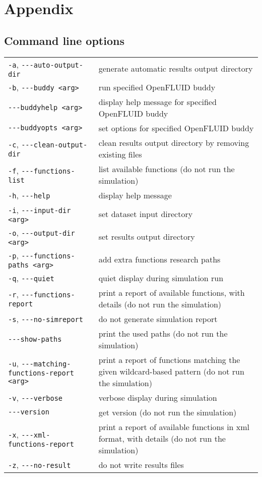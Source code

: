 \chapter{Appendix}



\section{Command line options}

\begin{center}
\begin{tabularx}{\linewidth}{lX}
\texttt{-a}, \verb?---?\texttt{auto-output-dir}&generate automatic results output directory\\
\texttt{-b}, \verb?---?\texttt{buddy <arg>}&run specified OpenFLUID buddy\\
\verb?---?\texttt{buddyhelp <arg>}&display help message for specified OpenFLUID buddy\\
\verb?---?\texttt{buddyopts <arg>}&set options for specified OpenFLUID buddy\\
\texttt{-c}, \verb?---?\texttt{clean-output-dir}&clean results output directory by removing existing files\\
\texttt{-f}, \verb?---?\texttt{functions-list}&list available functions (do not run the simulation)\\
\texttt{-h}, \verb?---?\texttt{help}&display help message\\
\texttt{-i}, \verb?---?\texttt{input-dir <arg>}&set dataset input directory\\
\texttt{-o}, \verb?---?\texttt{output-dir <arg>}&set results output directory\\
\texttt{-p}, \verb?---?\texttt{functions-paths <arg>}&add extra functions research paths\\
\texttt{-q}, \verb?---?\texttt{quiet}&quiet display during simulation run\\
\texttt{-r}, \verb?---?\texttt{functions-report}&print a report of available functions, with details (do not run the simulation)\\
\texttt{-s}, \verb?---?\texttt{no-simreport}&do not generate simulation report\\
\verb?---?\texttt{show-paths}&print the used paths (do not run the simulation)\\
\texttt{-u}, \verb?---?\texttt{matching-functions-report <arg>}&print a report of functions matching the given wildcard-based pattern (do not run the simulation)\\
\texttt{-v}, \verb?---?\texttt{verbose}&verbose display during simulation\\
\verb?---?\texttt{version}&get version (do not run the simulation)\\
\texttt{-x}, \verb?---?\texttt{xml-functions-report}&print a report of available functions in xml format, with details (do not run the simulation)\\
\texttt{-z}, \verb?---?\texttt{no-result}&do not write results files\\
\end{tabularx}
\end{center}

